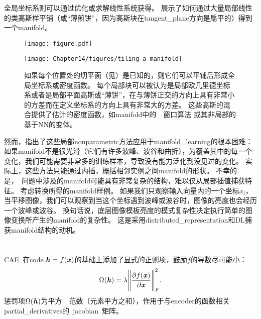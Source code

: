 全局坐标系则可以通过优化或求解线性系统获得。
展示了如何通过大量局部线性的类高斯样平铺（或``薄煎饼''，因为高斯块在\gls{tangent_plane}方向是扁平的）得到一个\gls{manifold}。

\begin{figure}[!htb]
\ifOpenSource
\centerline{\texttt{[image: figure.pdf]}}
\else
\centerline{\texttt{[image: Chapter14/figures/tiling-a-manifold]}}
\fi
\caption{如果每个位置处的切平面（见）是已知的，则它们可以平铺后形成全局坐标系或密度函数。
每个局部块可以被认为是局部欧几里德坐标系或者是局部平面高斯或``薄饼''，在与薄饼正交的方向上具有非常小的方差而在定义坐标系的方向上具有非常大的方差。
这些高斯的混合提供了估计的密度函数，如\gls{manifold}中的~~窗口算法\citep{Vincent-Bengio-2003-short} 或其非局部的基于\gls{NN}的变体\citep{Bengio-Larochelle-NLMP-NIPS-2006-short}。
}
\label{fig:chap14_tiling-a-manifold}
\end{figure}

然而，\citet{Bengio+Monperrus-2005}指出了这些局部\gls{nonparametric}方法应用于\gls{manifold_learning}的根本困难：如果\gls{manifold}不是很光滑（它们有许多波峰、波谷和曲折），为覆盖其中的每一个变化，我们可能需要非常多的训练样本，导致没有能力泛化到没见过的变化。
实际上，这些方法只能通过内插，概括相邻实例之间\gls{manifold}的形状。
不幸的是，~问题中涉及的\gls{manifold}可能具有非常复杂的结构，难以仅从局部插值捕获特征。
考虑转换所得的\gls{manifold}样例。
如果我们只观察输入向量内的一个坐标$x_i$，当平移图像，我们可以观察到当这个坐标遇到波峰或波谷时，图像的亮度也会经历一个波峰或波谷。
换句话说，底层图像模板亮度的模式复杂性决定执行简单的图像变换所产生的\gls{manifold}的复杂性。
这是采用\gls{distributed_representation}和\gls{DL}捕获\gls{manifold}结构的动机。


\section{}
\label{sec:contractive_autoencoders}
\gls{CAE}~\citep{Rifai+al-2011-small,Salah+al-2011-small}在\gls{code} $\boldsymbol{\mathit{h}} = f(\boldsymbol{\mathit{x}})$的基础上添加了显式的正则项，鼓励$f$的导数尽可能小：
\begin{align}
 \Omega(\boldsymbol{\mathit{h}}) = \lambda \Bigg\| \frac{\partial f(\boldsymbol{\mathit{x}})}{\partial \boldsymbol{\mathit{x}}} \Bigg\|_F^2 .
\end{align}
惩罚项$\Omega(\boldsymbol{\mathit{h}})$为平方~~范数（元素平方之和），作用于与\gls{encoder}的函数相关\gls{partial_derivatives}的~\gls{jacobian}~矩阵。


